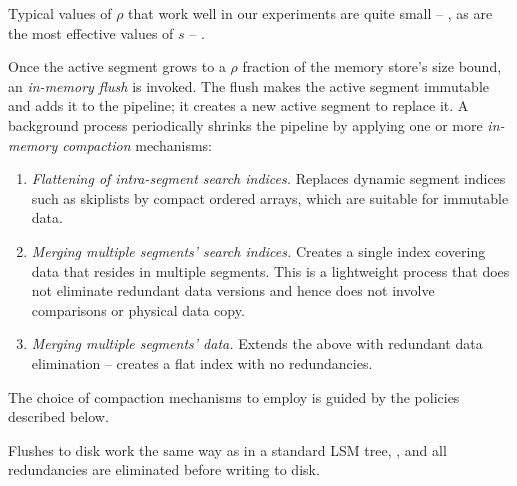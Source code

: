 Typical values of $\rho$ that work well in our experiments are quite small -- , as are the most effective values
of $s$ -- . 

Once the active segment grows to a $\rho$ fraction of the memory store's size bound, an \emph{in-memory flush} is invoked.
The flush makes the active segment  immutable and adds it to the pipeline; it creates a new active segment to replace it. 
A background process periodically shrinks the pipeline by applying 
one or more \emph{in-memory compaction} mechanisms: 
\begin{enumerate}
\item {\em Flattening of intra-segment search indices.} Replaces dynamic segment indices such as skiplists by 
compact ordered arrays, which are suitable for immutable data. 
\item {\em Merging multiple segments' search indices.} 
Creates a single index covering data that resides in multiple segments. 
This is a lightweight process that does not eliminate redundant data versions 
and hence does not involve comparisons or physical data copy. 
\item  {\em Merging multiple segments' data.} Extends the above with redundant data elimination -- creates
a flat index with no redundancies. 
\end{enumerate} 
The choice of compaction mechanisms to employ is guided by the policies described below.

Flushes to disk work the same way as in a standard LSM tree, 
, and all 
redundancies are eliminated before writing to disk.

 
 

